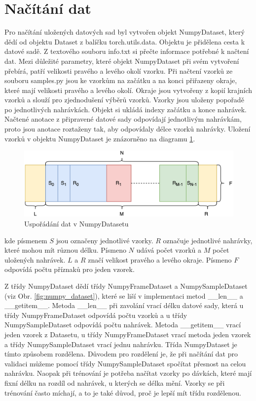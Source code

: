 \documentclass[FM,BP]{tulthesis}
\begin{document}
\section{Načítání dat} %
Pro načítání uložených datových sad byl vytvořen objekt NumpyDataset, který dědí od objektu Dataset z balíčku torch.utils.data. Objektu je přidělena cesta k datové sadě. Z textového souboru info.txt si přečte informace potřebné k načtení dat. Mezi důležité parametry, které objekt NumpyDataset při svém vytvoření přebírá, patří velikosti pravého a levého okolí vzorku. Při načtení vzorků ze souboru samples.py jsou ke vzorkům na začátku a na konci přiřazeny okraje, které mají velikosti pravého a levého okolí. Okraje jsou vytvořeny z kopií krajních vzorků a slouží pro zjednodušení výběrů vzorků. Vzorky jsou uloženy popořadě po jednotlivých nahrávkách. Objekt si ukládá indexy začátku a konce nahrávek. Načtené anotace z připravené datové sady odpovídají jednotlivým nahrávkám, proto jsou anotace roztaženy tak, aby odpovídaly délce vzorků nahrávky. Uložení vzorků v objektu NumpyDataset je znázorněno na diagramu \ref{fig:data_arrangement}.

\begin{figure}[htbp]
\centerline{\includegraphics[scale=.125]{dataset_arrangement.png}}
\caption{Uspořádání dat v NumpyDatasetu}
\label{fig:data_arrangement}
\end{figure}
\FloatBarrier

kde písmenem $ S $ jsou označeny jednotlivé vzorky. $ R $ označuje jednotlivé nahrávky, které mohou mít různou délku. Písmeno $ N $ udává počet vzorků a $ M $ počet uložených nahrávek. $ L $ a $ R $ značí velikost pravého a levého okraje. Písmeno $ F $ odpovídá počtu příznaků pro jeden vzorek.

Z třídy NumpyDataset dědí třídy NumpyFrameDataset a NumpySampleDataset (viz Obr. \ref{fig:numpy_dataset}), které se liší v implementaci metod \_\_len\_\_ a \_\_getitem\_\_. Metoda \_\_len\_\_ při zavolání vrací délku datové sady, která u třídy NumpyFrameDataset odpovídá počtu vzorků a u třídy NumpySampleDataset odpovídá počtu nahrávek. Metoda \_\_getitem\_\_ vrací jeden vzorek z Datasetu, u třídy NumpyFrameDataset vrací metoda jeden vzorek a třídy NumpySampleDataset vrací jednu nahrávku. Třída NumpyDataset je tímto způsobem rozdělena. Důvodem pro rozdělení je, že při načítání dat pro validaci můžeme pomocí třídy NumpySampleDataset spočítat přesnost na celou nahrávku. Naopak při trénování je potřeba načítat vzorky po dávkách, které mají fixní délku na rozdíl od nahrávek, u kterých se délka mění. Vzorky se při trénování často míchají, a to je také důvod, proč je lepší mít třídu rozdělenou.
\end{document}
